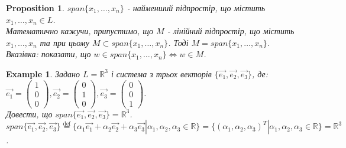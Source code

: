 \documentclass[a4paper, 10pt]{article}
\theoremstyle{theoremdd}
\newtheorem{example}[theorem]{Example}
\newtheorem{proposition}[theorem]{Proposition}
\newtheorem{remark}[theorem]{Remark}
\begin{document}
	\begin{proposition}
	$span \{x_1,\dots,x_n \}$ - найменший підпростір, що містить $x_1,\dots,x_n \in L$.\\
	Математично кажучи, припустимо, що $M$ - лінійний підпростір, що містить $x_1,\dots,x_n$ та при цьому $M \subset span \{x_1,\dots,x_n \}$. Тоді $M = span \{x_1,\dots,x_n \}$.\\
	\textit{Вказівка: показати, що} $w \in span\{x_1,\dots,x_n \} \iff w \in M$.
	\end{proposition}
	
	\begin{example}
	Задано $L = \mathbb{R}^3$ і система з трьох векторів $\{\vec{e_1},\vec{e_2},\vec{e_3}\}$, де:\\
	$\vec{e_1} =\begin{pmatrix} 1\\ 0\\ 0 \end{pmatrix}, \vec{e_2} =\begin{pmatrix} 0\\ 1\\ 0 \end{pmatrix}, \vec{e_3} =\begin{pmatrix} 0\\ 0\\ 1 \end{pmatrix}$.\\
	Довести, що $span\{\vec{e_1}, \vec{e_2}, \vec{e_3}\} = \mathbb{R}^3$.\\
	$span\{\vec{e_1}, \vec{e_2}, \vec{e_3}\} \overset{\textrm{def}}{=} \{\alpha_1 \vec{e_1} + \alpha_2 \vec{e_2} + \alpha_3 \vec{e_3} | \alpha_1, \alpha_2, \alpha_3 \in \mathbb{R}\} = \{(\alpha_1, \alpha_2, \alpha_3)^T | \alpha_1, \alpha_2, \alpha_3 \in \mathbb{R}\} = \mathbb{R}^3$.
	\end{example}
	
	\iffalse
	\begin{remark}
	Трошки англійського означення. Там кажуть, що system $\{ x_n,\dots,x_n \}$ \textbf{spans} linear space $L$, if $\{x_1,\dots,x_n\} = L$. Адаптивного перекладу цього поки не знаю.
	\end{remark}
	\fi
		
\end{document}
